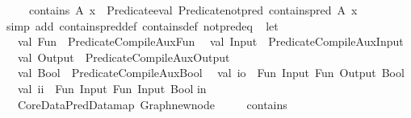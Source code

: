 \begin{isabellebody}
\ \ \ {\isachardoublequoteopen}{\isasymnot}\ contains\ A\ x\ {\isacharequal}{\kern0pt}{\isacharequal}{\kern0pt}{\isachargreater}{\kern0pt}\ Predicate{\isachardot}{\kern0pt}eval\ {\isacharparenleft}{\kern0pt}Predicate{\isachardot}{\kern0pt}not{\isacharunderscore}{\kern0pt}pred\ {\isacharparenleft}{\kern0pt}contains{\isacharunderscore}{\kern0pt}pred\ A\ x{\isacharparenright}{\kern0pt}{\isacharparenright}{\kern0pt}\ {\isacharparenleft}{\kern0pt}{\isacharparenright}{\kern0pt}{\isachardoublequoteclose}\isanewline
%
\isadelimproof
%
\endisadelimproof
%
\isatagproof
{}\isamarkupfalse%
{\isacharparenleft}{\kern0pt}simp\ add{\isacharcolon}{\kern0pt}\ contains{\isacharunderscore}{\kern0pt}pred{\isacharunderscore}{\kern0pt}def\ contains{\isacharunderscore}{\kern0pt}def\ not{\isacharunderscore}{\kern0pt}pred{\isacharunderscore}{\kern0pt}eq{\isacharparenright}{\kern0pt}%
\endisatagproof
{\isafoldproof}%
%
\isadelimproof
\isanewline
%
\endisadelimproof
%
\isadelimML
\isanewline
%
\endisadelimML
%
\isatagML
{}\isamarkupfalse%
\ {\isacartoucheopen}\isanewline
let\isanewline
\ \ val\ Fun\ {\isacharequal}{\kern0pt}\ Predicate{\isacharunderscore}{\kern0pt}Compile{\isacharunderscore}{\kern0pt}Aux{\isachardot}{\kern0pt}Fun\isanewline
\ \ val\ Input\ {\isacharequal}{\kern0pt}\ Predicate{\isacharunderscore}{\kern0pt}Compile{\isacharunderscore}{\kern0pt}Aux{\isachardot}{\kern0pt}Input\isanewline
\ \ val\ Output\ {\isacharequal}{\kern0pt}\ Predicate{\isacharunderscore}{\kern0pt}Compile{\isacharunderscore}{\kern0pt}Aux{\isachardot}{\kern0pt}Output\isanewline
\ \ val\ Bool\ {\isacharequal}{\kern0pt}\ Predicate{\isacharunderscore}{\kern0pt}Compile{\isacharunderscore}{\kern0pt}Aux{\isachardot}{\kern0pt}Bool\isanewline
\ \ val\ io\ {\isacharequal}{\kern0pt}\ Fun\ {\isacharparenleft}{\kern0pt}Input{\isacharcomma}{\kern0pt}\ Fun\ {\isacharparenleft}{\kern0pt}Output{\isacharcomma}{\kern0pt}\ Bool{\isacharparenright}{\kern0pt}{\isacharparenright}{\kern0pt}\isanewline
\ \ val\ ii\ {\isacharequal}{\kern0pt}\ Fun\ {\isacharparenleft}{\kern0pt}Input{\isacharcomma}{\kern0pt}\ Fun\ {\isacharparenleft}{\kern0pt}Input{\isacharcomma}{\kern0pt}\ Bool{\isacharparenright}{\kern0pt}{\isacharparenright}{\kern0pt}\isanewline
in\isanewline
\ \ Core{\isacharunderscore}{\kern0pt}Data{\isachardot}{\kern0pt}PredData{\isachardot}{\kern0pt}map\ {\isacharparenleft}{\kern0pt}Graph{\isachardot}{\kern0pt}new{\isacharunderscore}{\kern0pt}node\ \isanewline
\ \ \ \ {\isacharparenleft}{\kern0pt}\isactrlconstUNDERSCOREname {\isasymopen}contains{\isasymclose}{\isacharcomma}{\kern0pt}\ \isanewline

\end{isabellebody}
